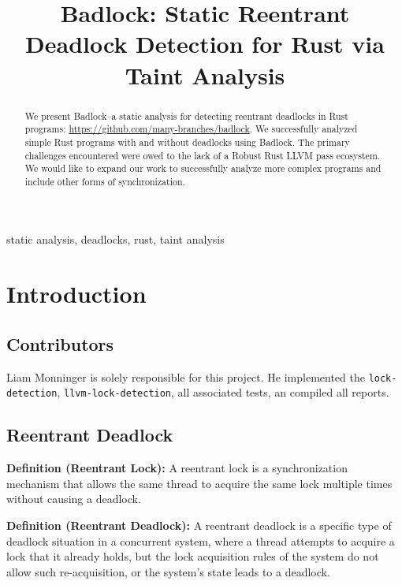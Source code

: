 \documentclass[conference]{IEEEtran}
\begin{document}
\title{Badlock: Static Reentrant Deadlock Detection for Rust via Taint Analysis}

\author{
}

\maketitle

\begin{abstract}
We present Badlock--a static analysis for detecting reentrant deadlocks in Rust programs: \href{https://github.com/many-branches/badlock}{https://github.com/many-branches/badlock}. We successfully analyzed simple Rust programs with and without deadlocks using Badlock. The primary challenges encountered were owed to the lack of a Robust Rust LLVM pass ecosystem. We would like to expand our work to successfully analyze more complex programs and include other forms of synchronization.
\end{abstract}

\begin{IEEEkeywords}
static analysis, deadlocks, rust, taint analysis
\end{IEEEkeywords}

\section{Introduction}

\subsection{Contributors}
Liam Monninger is solely responsible for this project. He implemented the \verb|lock-detection|, \verb|llvm-lock-detection|, all associated tests, an compiled all reports.

\subsection{Reentrant Deadlock}
\textbf{Definition (Reentrant Lock):} A reentrant lock is a synchronization mechanism that allows the same thread to acquire the same lock multiple times without causing a deadlock. 

\textbf{Definition (Reentrant Deadlock):} A reentrant deadlock is a specific type of deadlock situation in a concurrent system, where a thread attempts to acquire a lock that it already holds, but the lock acquisition rules of the system do not allow such re-acquisition, or the system's state leads to a deadlock.
\end{document}

